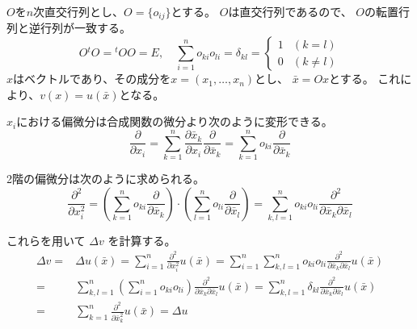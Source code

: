 \documentclass[12pt,b5paper]{ltjsarticle}
\begin{document}
\begin{enumerate}
      $O$を$n$次直交行列とし、$O=\{o_{ij}\}$とする。
      $O$は直交行列であるので、
      $O$の転置行列と逆行列が一致する。
      \begin{equation}
       O{}^{t}O = {}^{t}O O = E
        ,\quad
        \sum_{i=1}^{n}o_{ki}o_{li} = \delta_{kl}
        =
        \begin{cases}
         1 & (k=l)\\
         0 & (k\ne l)
        \end{cases}
      \end{equation}
      $x$はベクトルであり、その成分を$x=(x_{1},\dots,x_{n})$とし、
      $\bar{x} = Ox$とする。
      これにより、$v(x)=u(\bar{x})$となる。

      $x_{i}$における偏微分は合成関数の微分より次のように変形できる。
      \begin{equation}
       \frac{\partial}{\partial x_{i}}
        = \sum_{k=1}^{n}\frac{\partial \bar{x}_{k}}{\partial x_{i}}
              \frac{\partial}{\partial \bar{x}_{k}}
        = \sum_{k=1}^{n} o_{ki}\frac{\partial}{\partial \bar{x}_{k}}
      \end{equation}

      2階の偏微分は次のように求められる。
      \begin{equation}
       \frac{\partial^{2}}{\partial x_{i}^{2}}
        =\left( \sum_{k=1}^{n} o_{ki}\frac{\partial}{\partial \bar{x}_{k}} \right) \cdot
        \left( \sum_{l=1}^{n} o_{li}\frac{\partial}{\partial \bar{x}_{l}} \right)
        =
        \sum_{k,l = 1}^{n} o_{ki}o_{li}\frac{\partial^{2}}{\partial \bar{x}_{k}\partial \bar{x}_{l}}
      \end{equation}

      これらを用いて
      $\Delta v$ を計算する。
      \begin{align}
       \Delta v
         =& \Delta u(\bar{x})
         = \sum_{i=1}^{n} \frac{\partial^2}{\partial x_{i}^{2}}u(\bar{x})
         = \sum_{i=1}^{n} \sum_{k,l = 1}^{n} o_{ki}o_{li}
           \frac{\partial^{2}}{\partial \bar{x}_{k}\partial \bar{x}_{l}} u(\bar{x})\\
         =& \sum_{k,l = 1}^{n} \left( \sum_{i=1}^{n} o_{ki}o_{li} \right)
           \frac{\partial^{2}}{\partial \bar{x}_{k}\partial \bar{x}_{l}} u(\bar{x})
         = \sum_{k,l = 1}^{n} \delta_{kl}
           \frac{\partial^{2}}{\partial \bar{x}_{k}\partial \bar{x}_{l}} u(\bar{x})\\
         =& \sum_{k = 1}^{n}
           \frac{\partial^{2}}{\partial \bar{x}_{k}^{2}} u(\bar{x})
         = \Delta u
      \end{align}


\end{enumerate}
\end{document}
